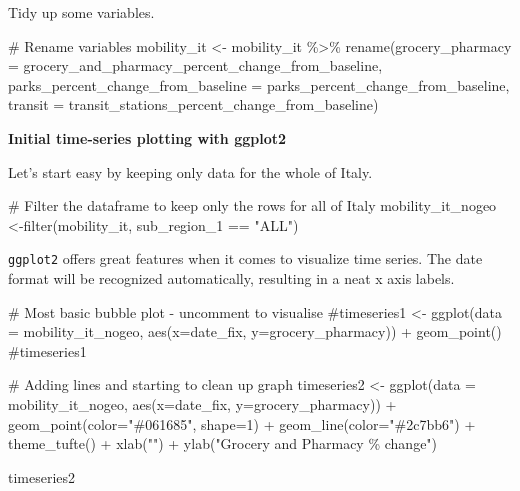 \documentclass[
  letterpaper,
  DIV=11,
  numbers=noendperiod]{scrreprt}
\newenvironment{Shaded}{\begin{snugshade}}{\end{snugshade}}
\newcommand{\AttributeTok}[1]{\textcolor[rgb]{0.40,0.45,0.13}{#1}}
\newcommand{\CommentTok}[1]{\textcolor[rgb]{0.37,0.37,0.37}{#1}}
\newcommand{\DecValTok}[1]{\textcolor[rgb]{0.68,0.00,0.00}{#1}}
\newcommand{\FunctionTok}[1]{\textcolor[rgb]{0.28,0.35,0.67}{#1}}
\newcommand{\NormalTok}[1]{\textcolor[rgb]{0.00,0.23,0.31}{#1}}
\newcommand{\OtherTok}[1]{\textcolor[rgb]{0.00,0.23,0.31}{#1}}
\newcommand{\SpecialCharTok}[1]{\textcolor[rgb]{0.37,0.37,0.37}{#1}}
\newcommand{\StringTok}[1]{\textcolor[rgb]{0.13,0.47,0.30}{#1}}
\begin{document}
Tidy up some variables.

\begin{Shaded}
\begin{Highlighting}[]
\CommentTok{\# Rename variables}
\NormalTok{mobility\_it }\OtherTok{\textless{}{-}}\NormalTok{ mobility\_it }\SpecialCharTok{\%\textgreater{}\%}
  \FunctionTok{rename}\NormalTok{(}\AttributeTok{grocery\_pharmacy =}\NormalTok{ grocery\_and\_pharmacy\_percent\_change\_from\_baseline,}
         \AttributeTok{parks\_percent\_change\_from\_baseline =}\NormalTok{ parks\_percent\_change\_from\_baseline,}
         \AttributeTok{transit =}\NormalTok{ transit\_stations\_percent\_change\_from\_baseline)}
\end{Highlighting}
\end{Shaded}

\textbf{Initial time-series plotting with ggplot2}

Let's start easy by keeping only data for the whole of Italy.

\begin{Shaded}
\begin{Highlighting}[]
\CommentTok{\# Filter the dataframe to keep only the rows for all of Italy}
\NormalTok{mobility\_it\_nogeo }\OtherTok{\textless{}{-}}\FunctionTok{filter}\NormalTok{(mobility\_it, sub\_region\_1 }\SpecialCharTok{==} \StringTok{"ALL"}\NormalTok{)}
\end{Highlighting}
\end{Shaded}

\texttt{ggplot2} offers great features when it comes to visualize time
series. The date format will be recognized automatically, resulting in a
neat x axis labels.

\begin{Shaded}
\begin{Highlighting}[]
\CommentTok{\# Most basic bubble plot {-} uncomment to visualise}
\CommentTok{\#timeseries1 \textless{}{-} ggplot(data = mobility\_it\_nogeo, aes(x=date\_fix, y=grocery\_pharmacy)) + geom\_point()}
\CommentTok{\#timeseries1 }

\CommentTok{\# Adding lines and starting to clean up graph}
\NormalTok{timeseries2 }\OtherTok{\textless{}{-}} \FunctionTok{ggplot}\NormalTok{(}\AttributeTok{data =}\NormalTok{ mobility\_it\_nogeo, }\FunctionTok{aes}\NormalTok{(}\AttributeTok{x=}\NormalTok{date\_fix, }\AttributeTok{y=}\NormalTok{grocery\_pharmacy)) }\SpecialCharTok{+}
  \FunctionTok{geom\_point}\NormalTok{(}\AttributeTok{color=}\StringTok{"\#061685"}\NormalTok{, }\AttributeTok{shape=}\DecValTok{1}\NormalTok{) }\SpecialCharTok{+}
  \FunctionTok{geom\_line}\NormalTok{(}\AttributeTok{color=}\StringTok{"\#2c7bb6"}\NormalTok{) }\SpecialCharTok{+} 
  \FunctionTok{theme\_tufte}\NormalTok{() }\SpecialCharTok{+}
  \FunctionTok{xlab}\NormalTok{(}\StringTok{""}\NormalTok{) }\SpecialCharTok{+}
  \FunctionTok{ylab}\NormalTok{(}\StringTok{"Grocery and Pharmacy \% change"}\NormalTok{) }

\NormalTok{timeseries2}
\end{Highlighting}
\end{Shaded}
\end{document}
